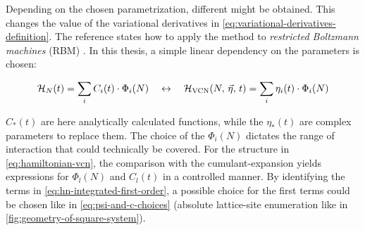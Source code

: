 Depending on the chosen parametrization, different \HvcnOft{\vec{\eta}} might be obtained. 
This changes the value of the variational derivatives in \autoref{eq:variational-derivatives-definition}.
The reference \cite{VCNsolutionForRBM} states how to apply the method to \emph{restricted Boltzmann machines} (RBM) \cite{neuralNetworkQuantumStates}.
In this thesis, a simple linear dependency on the parameters is chosen:

\begin{equation}
    \label{eq:hamiltonian-vcn}
    \HNOft = \lsum[i] C_i(t) \cdot \Phi_i(N) \quad\leftrightarrow\quad \HvcnOft{\vec{\eta}} = \lsum[i] \eta_i(t) \cdot \Phi_i(N)
\end{equation}

$C_\ast(t)$ are here analytically calculated functions, while the $\eta_\ast(t)$ are complex parameters to replace them.
The choice of the $\Phi_i(N)$ dictates the range of interaction that could technically be covered.
For the structure in \autoref{eq:hamiltonian-vcn}, the comparison with the cumulant-expansion yields expressions for $\Phi_l(N)$ and $C_l(t)$ in a controlled manner.
By identifying the terms in \autoref{eq:hn-integrated-first-order}, a possible choice for the first terms could be chosen like in \autoref{eq:psi-and-c-choices} (absolute lattice-site enumeration like in \autoref{fig:geometry-of-square-system}). 



